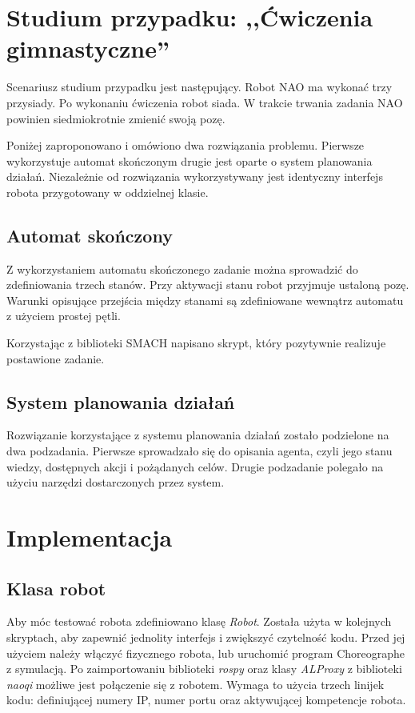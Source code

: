 \section{Studium przypadku: ,,Ćwiczenia gimnastyczne''}
\label{sec:koncepcja}
Scenariusz studium przypadku jest następujący. Robot NAO ma wykonać trzy przysiady. Po wykonaniu ćwiczenia robot siada. W trakcie trwania zadania NAO powinien siedmiokrotnie zmienić swoją pozę. 

Poniżej zaproponowano i omówiono dwa rozwiązania problemu. Pierwsze wykorzystuje automat skończonym drugie jest oparte o system planowania działań. Niezależnie od rozwiązania wykorzystywany jest identyczny interfejs robota przygotowany w oddzielnej klasie.

\subsection{Automat skończony}
\label{subsec:k_automat}
Z wykorzystaniem automatu skończonego zadanie można sprowadzić do zdefiniowania trzech stanów. Przy aktywacji stanu robot przyjmuje ustaloną pozę. Warunki opisujące przejścia między stanami są zdefiniowane wewnątrz automatu z użyciem prostej pętli. 

Korzystając z biblioteki SMACH napisano skrypt, który pozytywnie realizuje postawione zadanie.

\subsection{System planowania działań}
\label{subsec:k_goap}
Rozwiązanie korzystające z systemu planowania działań zostało podzielone na dwa podzadania. Pierwsze sprowadzało się do opisania agenta, czyli jego stanu wiedzy, dostępnych akcji i pożądanych celów. Drugie podzadanie polegało na użyciu narzędzi dostarczonych przez system.


\section{Implementacja}
\subsection{Klasa robot}
Aby móc testować robota zdefiniowano klasę \textit{Robot}. Została użyta w kolejnych skryptach, aby zapewnić jednolity interfejs i zwiększyć czytelność kodu. Przed jej użyciem należy włączyć fizycznego robota, lub uruchomić program Choreographe z symulacją.
Po zaimportowaniu biblioteki \textit{rospy} oraz klasy \textit{ALProxy} z biblioteki \textit{naoqi} możliwe jest połączenie się z robotem. Wymaga to użycia trzech linijek kodu: definiującej numery IP, numer portu oraz aktywującej kompetencje robota.


